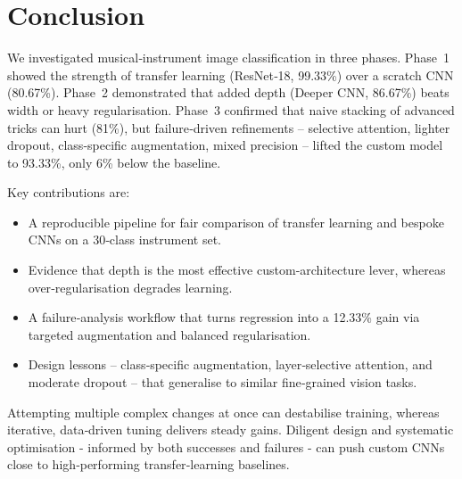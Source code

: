 
\section{Conclusion}
\noindent
We investigated musical‑instrument image classification in three phases. Phase~1 showed the strength of transfer learning (ResNet‑18, 99.33\%) over a scratch CNN (80.67\%). Phase~2 demonstrated that added depth (Deeper CNN, 86.67\%) beats width or heavy regularisation. Phase~3 confirmed that naive stacking of advanced tricks can hurt (81\%), but failure‑driven refinements – selective attention, lighter dropout, class‑specific augmentation, mixed precision – lifted the custom model to 93.33\%, only 6\% below the baseline.

\noindent
Key contributions are:
\begin{itemize}
    \item A reproducible pipeline for fair comparison of transfer learning and bespoke CNNs on a 30‑class instrument set.
    \item Evidence that depth is the most effective custom‑architecture lever, whereas over‑regularisation degrades learning.
    \item A failure‑analysis workflow that turns regression into a 12.33\% gain via targeted augmentation and balanced regularisation.
    \item Design lessons – class‑specific augmentation, layer‑selective attention, and moderate dropout – that generalise to similar fine‑grained vision tasks.
\end{itemize}

\noindent
Attempting multiple complex changes at once can destabilise training, whereas iterative, data‑driven tuning delivers steady gains. Diligent design and systematic optimisation  -  informed by both successes and failures  -  can push custom CNNs close to high‑performing transfer‑learning baselines. 
